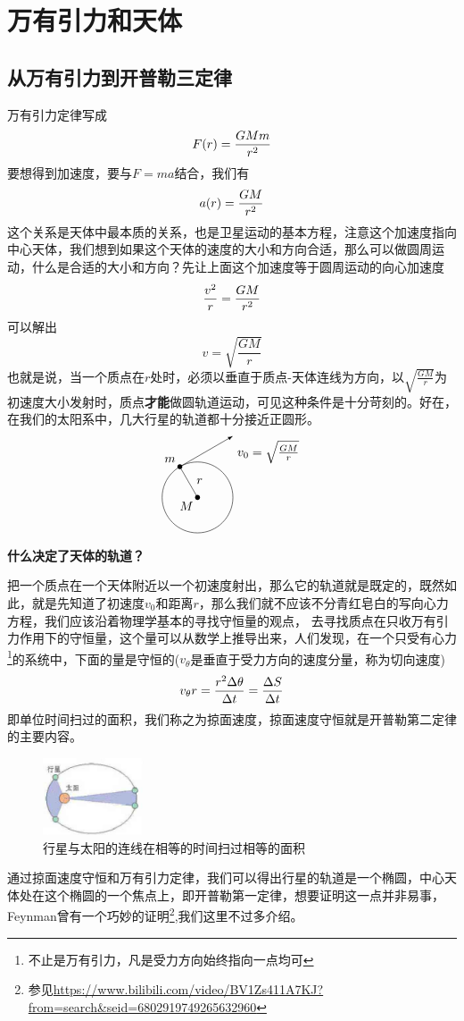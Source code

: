 \documentclass[hyperref,UTF8]{ctexart}
\begin{document}
\section{万有引力和天体}
\subsection{从万有引力到开普勒三定律}
万有引力定律写成
\[F(r) = {GMm \over r^2}\]
要想得到加速度，要与$F=ma$结合，我们有
\[a(r) = {GM \over r^2}\]
这个关系是天体中最本质的关系，也是卫星运动的基本方程，注意这个加速度指向中心天体，我们想到如果这个天体的速度的大小和方向合适，那么可以做圆周运动，什么是合适的大小和方向？先让上面这个加速度等于圆周运动的向心加速度
\[{v^2 \over r} = {GM \over r^2}\]
可以解出
\[v = \sqrt{\frac{GM}{r}}\]
也就是说，当一个质点在$r$处时，必须以垂直于质点-天体连线为方向，以$\sqrt{\frac{GM}{r}}$为初速度大小发射时，质点\textbf{才能}做圆轨道运动，可见这种条件是十分苛刻的。好在，在我们的太阳系中，几大行星的轨道都十分接近正圆形。\\
\[
\begin{tikzpicture}
    \draw (0,0) circle (1cm);
    \fill (120:1) circle (2pt);
    \fill (0,0) circle (2pt);
    \node[below left] (O) at (0,0) {$M$};
    \node[above left] (A) at (120:1) {$m$};
    \node[below right] (A) at (60:2) {$v_0 = \sqrt{\frac{GM}{r}}$};
    \draw[-latex] (120:1)--(60:2);
    \draw (0,0)--(120:1);
    \node[above right] (O) at (120:0.3) {$r$};
\end{tikzpicture}
\]
\textbf{什么决定了天体的轨道？}

把一个质点在一个天体附近以一个初速度射出，那么它的轨道就是既定的，既然如此，就是先知道了初速度$v_0$和距离$r$，那么我们就不应该不分青红皂白的写向心力方程，我们应该沿着物理学基本的寻找守恒量的观点，
去寻找质点在只收万有引力作用下的守恒量，这个量可以从数学上推导出来，人们发现，在一个只受有心力\footnote{不止是万有引力，凡是受力方向始终指向一点均可}的系统中，下面的量是守恒的($v_\theta$是垂直于受力方向的速度分量，称为切向速度)
\[v_{\theta}r = {r^2\Delta \theta \over \Delta t} = {\Delta S \over \Delta t}\]
即单位时间扫过的面积，我们称之为掠面速度，掠面速度守恒就是开普勒第二定律的主要内容。
\begin{figure}[H]
    \centering
    \includegraphics[width=3cm]{掠面速度.png}
    \caption{行星与太阳的连线在相等的时间扫过相等的面积}
\end{figure}
通过掠面速度守恒和万有引力定律，我们可以得出行星的轨道是一个椭圆，中心天体处在这个椭圆的一个焦点上，即开普勒第一定律，想要证明这一点并非易事，Feynman曾有一个巧妙的证明\footnote{参见\url{https://www.bilibili.com/video/BV1Zs411A7KJ?from=search&seid=6802919749265632960}},我们这里不过多介绍。
\end{document}
